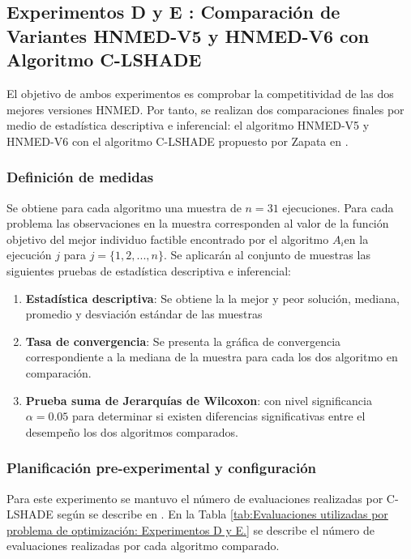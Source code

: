 \subsection{Experimentos D y E : Comparación de Variantes HNMED-V5 y HNMED-V6 con Algoritmo C-LSHADE}
El objetivo de ambos experimentos es comprobar la competitividad  de las dos mejores versiones HNMED. Por tanto, se realizan dos comparaciones finales por medio de estadística descriptiva e inferencial: el algoritmo HNMED-V5 y HNMED-V6 con el algoritmo C-LSHADE propuesto por Zapata en \cite{zapata_zapata_control_2017}.
\subsubsection{Definición de medidas}
Se obtiene para cada algoritmo una muestra de $n=31$ ejecuciones. Para cada problema las observaciones en la muestra corresponden al valor de la función objetivo del mejor individuo factible encontrado por el algoritmo $A_i$en la ejecución $j$ para $j= \{ 1,2,...,n\}$. Se aplicarán al conjunto de muestras las siguientes pruebas de estadística descriptiva e inferencial:
\begin{enumerate}
	\item \textbf{Estadística descriptiva}: Se obtiene la la mejor y peor solución, mediana, promedio y desviación estándar de las muestras
	\item \textbf{Tasa de convergencia}: Se presenta la gráfica de convergencia correspondiente a la mediana de la muestra para cada los dos algoritmo en comparación.
	\item \textbf{Prueba suma de Jerarquías de Wilcoxon}: con nivel significancia $\alpha=0.05$ para determinar si existen diferencias significativas entre el desempeño los dos algoritmos comparados. 
	
\end{enumerate}
\subsubsection{Planificación pre-experimental y configuración}
Para este experimento se mantuvo el número de evaluaciones realizadas por C-LSHADE según se describe en \cite{zapata_zapata_control_2017}. En la Tabla \ref{tab:Evaluaciones utilizadas por problema de optimización: Experimentos D y E.} se describe el número de evaluaciones realizadas por cada algoritmo comparado.

